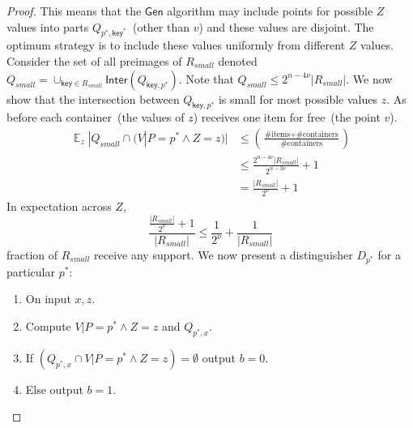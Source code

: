 \documentclass[11pt]{article}
\DeclareMathOperator*{\expe}{\mathbb{E}}
\newcommand{\class}[1]{{\ensuremath{\mathsf{#1}}}}
\newcommand{\key}{\ensuremath{\class{key}}\xspace}
\newcommand{\gen}{\ensuremath{\class{Gen}}\xspace}
\newcommand{\inter}{\ensuremath{\class{Inter}}\xspace}
\newcommand{\ngl}{\ensuremath{\mathtt{ngl}}\xspace}
\begin{document}
\begin{proof}
This means that the $\gen$ algorithm may include points for possible $Z$ values into parts $Q_{p^*, \key^*}$~(other than $v$) and these values are disjoint.  The optimum strategy is to include these values uniformly from different $Z$ values.  Consider the set of all preimages of $R_{small}$ denoted $Q_{small} = \cup_{\key\in R_{small}} \inter(Q_{\key, p^*})$.  Note that $Q_{small} \le 2^{n-4\nu}|R_{small}|$.  We now show that the intersection between $Q_{\key, p^*}$ is small for most possible values $z$.  As before each container~(the values of $z$)  receives one item for free~(the point $v$).
\begin{align*}
\expe_z |Q_{small} \cap (V | P=p^* \wedge Z=z) | &\le \left(\frac{\text{\# items}+\text{\# containers}}{\text{\# containers}}\right)\\
&\le \frac{2^{n-4\nu}|R_{small}|}{2^{n - 3\nu}}+1\\
&=\frac{|R_{small}|}{2^{\nu}}+1
\end{align*}
In expectation across $Z$, 
\[\frac{\frac{|R_{small}|}{2^{\nu}}+1}{|R_{small}|} \le \frac{1}{2^\nu}+\frac{1}{|R_{small}|} \] fraction of $R_{small}$ receive any support.  %
We now present a distinguisher $D_{p^*}$ for a particular $p^*$:
\begin{enumerate}
\item On input $x, z$.
\item Compute $V|P=p^* \wedge Z=z$ and $Q_{p^*, x}$. 
\item If $(Q_{p^*, x} \cap V|P=p^* \wedge Z=z) =\emptyset$ output $b=0$.
\item Else output $b=1$.
\end{enumerate}


\end{proof}
\end{document}
